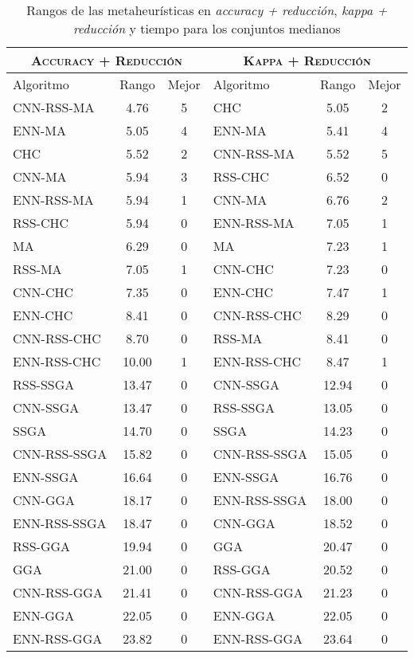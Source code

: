 \begin{table}[h!]
\centering
\begin{adjustbox}{max width =\textwidth}
\begin{tabular}{l c c|l c c}
\hline
\multicolumn{3}{c|}{\textsc{Accuracy + Reducción}}
	& \multicolumn{3}{c}{\textsc{Kappa + Reducción}}\\
\hline
Algoritmo & Rango & Mejor & Algoritmo & Rango & Mejor \\
\hline
\hline

CNN-RSS-MA   & 4.76  & 5 & CHC          & 5.05  & 2 \\
ENN-MA       & 5.05  & 4 & ENN-MA       & 5.41  & 4\\
CHC          & 5.52  & 2 & CNN-RSS-MA   & 5.52  & 5\\
CNN-MA       & 5.94  & 3 & RSS-CHC      & 6.52  & 0\\
ENN-RSS-MA   & 5.94  & 1 & CNN-MA       & 6.76  & 2\\
RSS-CHC      & 5.94  & 0 & ENN-RSS-MA   & 7.05  & 1\\
MA           & 6.29  & 0 & MA           & 7.23  & 1\\
RSS-MA       & 7.05  & 1 & CNN-CHC      & 7.23  & 0\\
CNN-CHC      & 7.35  & 0 & ENN-CHC      & 7.47  & 1\\
ENN-CHC      & 8.41  & 0 & CNN-RSS-CHC  & 8.29  & 0\\
CNN-RSS-CHC  & 8.70  & 0 & RSS-MA       & 8.41  & 0 \\
ENN-RSS-CHC  & 10.00 & 1 & ENN-RSS-CHC  & 8.47  & 1 \\
RSS-SSGA     & 13.47 & 0 & CNN-SSGA     & 12.94 & 0 \\
CNN-SSGA     & 13.47 & 0 & RSS-SSGA     & 13.05 & 0 \\
SSGA         & 14.70 & 0 & SSGA         & 14.23 & 0 \\
CNN-RSS-SSGA & 15.82 & 0 & CNN-RSS-SSGA & 15.05 & 0 \\
ENN-SSGA     & 16.64 & 0 & ENN-SSGA     & 16.76 & 0 \\
CNN-GGA      & 18.17 & 0 & ENN-RSS-SSGA & 18.00 & 0 \\
ENN-RSS-SSGA & 18.47 & 0 & CNN-GGA      & 18.52 & 0 \\
RSS-GGA      & 19.94 & 0 & GGA          & 20.47 & 0 \\
GGA          & 21.00 & 0 & RSS-GGA      & 20.52 & 0 \\
CNN-RSS-GGA  & 21.41 & 0 & CNN-RSS-GGA  & 21.23 & 0 \\
ENN-GGA      & 22.05 & 0 & ENN-GGA      & 22.05 & 0 \\
ENN-RSS-GGA  & 23.82 & 0 & ENN-RSS-GGA  & 23.64 & 0  \\

\hline
\end{tabular}
\end{adjustbox}
\caption{Rangos de las metaheurísticas en \emph{accuracy + reducción}, \emph{kappa + reducción} y tiempo para los conjuntos medianos}
\label{rank-med}
\end{table}


